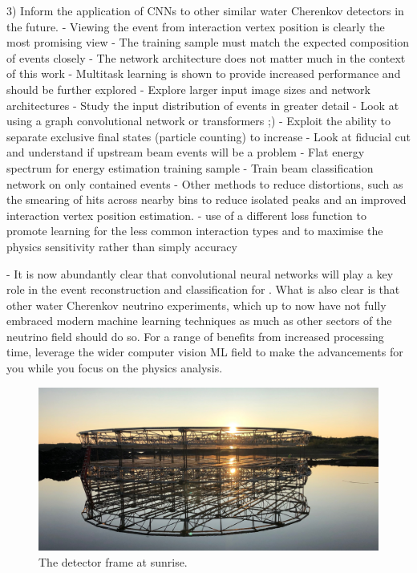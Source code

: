 3) Inform the application of CNNs to other similar water Cherenkov detectors in the future. 
    - Viewing the event from interaction vertex position is clearly the most promising view
    - The training sample must match the expected composition of events closely
    - The network architecture does not matter much in the context of this work
    - Multitask learning is shown to provide increased performance and should be further explored
    - Explore larger input image sizes and network architectures
    - Study the input distribution of events in greater detail
    - Look at using a graph convolutional network or transformers ;)
    - Exploit the ability to separate exclusive final states (particle counting) to increase 
    - Look at fiducial cut and understand if upstream beam events will be a problem
    - Flat energy spectrum for energy estimation training sample
    - Train beam classification network on only contained events
    - Other methods to reduce distortions, such as the smearing of hits across nearby bins to   
    reduce isolated peaks and an improved interaction vertex position estimation.
    - use of a different loss function to promote learning for the less common interaction types 
    and to maximise the physics sensitivity rather than simply accuracy

- It is now abundantly clear that convolutional neural networks will play a key role in the event
reconstruction and classification for \chips. What is also clear is that other water Cherenkov
neutrino experiments, which up to now have not fully embraced modern machine learning techniques
as much as other sectors of the neutrino field should do so. For a range of benefits from
increased processing time, leverage the wider computer vision ML field to make the advancements
for you while you focus on the physics analysis.

\begin{figure} %
    \includegraphics[width=\textwidth]{diagrams/4-chips/sunrise.pdf}
    \caption*{The \chipsfive detector frame at sunrise.}
\end{figure}